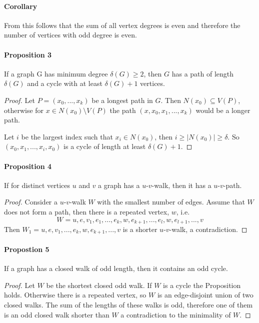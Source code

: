\paragraph{Corollary} From this follows that the sum of all vertex degrees is even and 
therefore the number of vertices with odd degree is even.

\paragraph{Proposition 3} If a graph G has minimum degree $ \delta(G) \geq 2 $, then
$ G $ has a path of length $ \delta(G) $ and a cycle with at least $ \delta(G) + 1 $
vertices.
\begin{proof}
Let $ P = (x_0,...,x_k) $ be a longest path in $ G $. Then $ N(x_0) \subseteq V(P)$,
otherwise for $ x \in N(x_0) \setminus V(P) $ the path $ (x,x_0,x_1,...,x_k) $ would
be a longer path.

\smallskip
Let $ i $ be the largest index such that $ x_i \in N(x_0) $, then $ i \geq |N(x_0)| 
\geq \delta $. So $ (x_0,x_1,...,x_i,x_0) $ is a cycle of length at least 
$ \delta(G) + 1$.
\end{proof}

\paragraph{Proposition 4} If for distinct vertices $ u $ and $ v $ a graph has 
a $u$-$v$-walk, then it has a $u$-$v$-path.
\begin{proof}
    Consider a $u$-$v$-walk $ W $ with the smallest number of edges. Assume that $ W $
    does not form a path, then there is a repeated vertex, $ w $, i.e.
    $$ W = u,e,v_1,e_1,...,e_k,w,e_{k+1},...,e_l,w,e_{l+1},...,v $$
    Then $ W_1 = u,e,v_1,...,e_k,w,e_{k+1},...,v $ is a shorter $u$-$v$-walk, 
    a contradiction.
\end{proof}


\paragraph{Propostion 5} If a graph has a closed walk of odd length, then it contains 
an odd cycle.
\begin{proof}
   Let $ W $ be the shortest closed odd walk. If $ W $ is a cycle the Proposition holds. 
   Otherwise there is a repeated vertex, so $ W $ is an edge-disjoint union of 
   two closed walks. The sum of the lengths of these walks is odd, therefore one 
   of them is an odd closed walk shorter than $ W $ a contradiction to the minimality
   of $ W $.
\end{proof}

